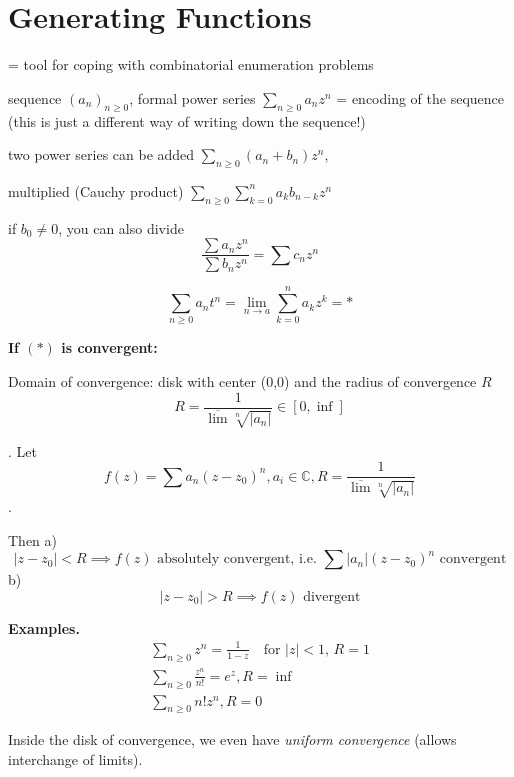 

\section{Generating Functions}

= tool for coping with combinatorial enumeration problems

sequence $(a_n)_{n≥0}$,
formal power series $\sum_{n≥0} a_n z^n$ = encoding of the sequence
(this is just a different way of writing down the sequence!)

two power series can be added
$\sum_{n≥0} (a_n + b_n) z^n$,

multiplied (Cauchy product)
$\sum_{n≥0}\sum_{k=0}^n a_k b_{n-k} z^n$

if $b_0 ≠ 0$, you can also divide
\[
    \frac{
        \sum a_n z^n
    }{
        \sum b_n z^n
    } =
        \sum c_n z^n
\]

\[
    \sum_{n≥0} a_n t^n
    = \lim_{n \to a} \sum_{k=0}^{n} a_k z^k = *
\]

\textbf{If $(*)$ is convergent:}

Domain of convergence: disk with center (0,0) and the radius of convergence $R$
\[
    R = \frac1{\overline{\lim} \sqrt[n]{|a_n|}}
    \in [0, \inf]
\]

\Theorem.
Let
\[
    f(z) = \sum a_n (z-z_0)^n,
    a_i\in \mathbb{C},
    R = \frac{1}{\overline{\lim} \sqrt[n]{|a_n|}}
\].

Then
a)
\[
    |z - z_0| < R \implies
    \text{$f(z)$ absolutely convergent,
    i.e.
    $\sum |a_n| (z-z_0)^n$ convergent}
\]
b)
\[
    |z - z_0| > R \implies \text{$f(z)$ divergent}
\]

\textbf{Examples.}
\begin{gather*}
    \sum_{n≥0} z^n =
        \frac1{1-z}\quad\text{for $|z|<1$, } R = 1 \\
    \sum_{n≥0} \frac{z^n}{n!} =
        e^z, R = \inf \\
    \sum_{n≥0} n! z^n, R = 0
\end{gather*}

Inside the disk of convergence, we even have \emph{uniform convergence} (allows interchange of limits).

